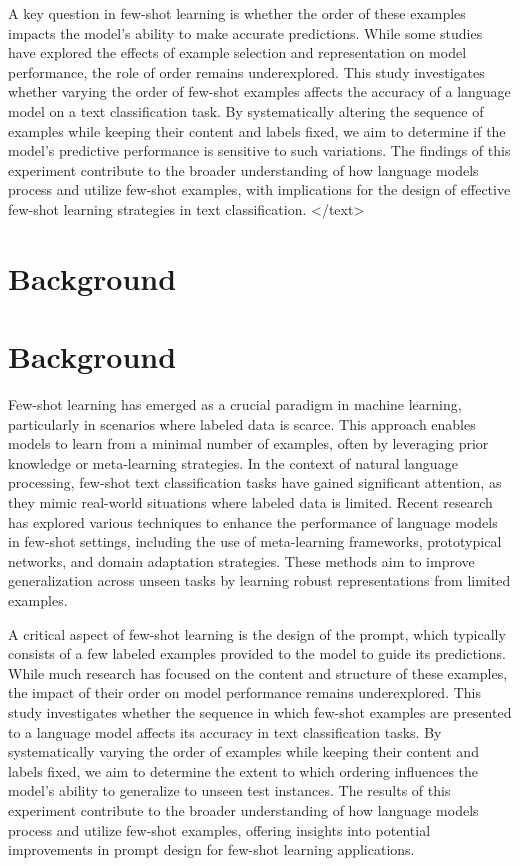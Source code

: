 \documentclass{article}
\begin{document}
A key question in few-shot learning is whether the order of these examples impacts the model's ability to make accurate predictions. While some studies have explored the effects of example selection and representation on model performance, the role of order remains underexplored. This study investigates whether varying the order of few-shot examples affects the accuracy of a language model on a text classification task. By systematically altering the sequence of examples while keeping their content and labels fixed, we aim to determine if the model's predictive performance is sensitive to such variations. The findings of this experiment contribute to the broader understanding of how language models process and utilize few-shot examples, with implications for the design of effective few-shot learning strategies in text classification.
</text>
\section{Background}
\section*{Background}

Few-shot learning has emerged as a crucial paradigm in machine learning, particularly in scenarios where labeled data is scarce. This approach enables models to learn from a minimal number of examples, often by leveraging prior knowledge or meta-learning strategies. In the context of natural language processing, few-shot text classification tasks have gained significant attention, as they mimic real-world situations where labeled data is limited. Recent research has explored various techniques to enhance the performance of language models in few-shot settings, including the use of meta-learning frameworks, prototypical networks, and domain adaptation strategies. These methods aim to improve generalization across unseen tasks by learning robust representations from limited examples.

A critical aspect of few-shot learning is the design of the prompt, which typically consists of a few labeled examples provided to the model to guide its predictions. While much research has focused on the content and structure of these examples, the impact of their order on model performance remains underexplored. This study investigates whether the sequence in which few-shot examples are presented to a language model affects its accuracy in text classification tasks. By systematically varying the order of examples while keeping their content and labels fixed, we aim to determine the extent to which ordering influences the model's ability to generalize to unseen test instances. The results of this experiment contribute to the broader understanding of how language models process and utilize few-shot examples, offering insights into potential improvements in prompt design for few-shot learning applications.
\end{document}
